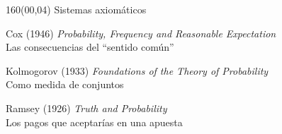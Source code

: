 \documentclass[shownotes,aspectratio=169]{beamer}
\begin{document}
\begin{frame}[plain] \centering
\begin{textblock}{160}(00,04)
\centering \LARGE Sistemas axiomáticos \\
\end{textblock}
\vspace{1.2cm} \centering

Cox (1946) \emph{Probability, Frequency and Reasonable Expectation}\\[0.1cm]
Las consecuencias del ``sentido común''

\vspace{0.8cm}

Kolmogorov (1933) \emph{Foundations of the Theory of Probability} \\[0.1cm]
Como medida de conjuntos

\vspace{0.8cm}

Ramsey (1926) \emph{Truth and Probability} \\[0.1cm]
Los pagos que aceptarías en una apuesta

\vspace{0.4cm}


\end{frame}
\end{document}
